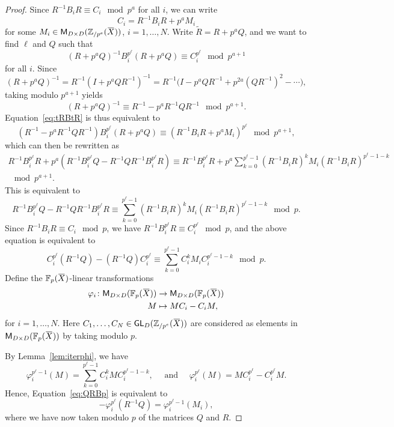 \documentclass[letterpaper, 11pt, thm-restate]{article}
\numberwithin{equation}{section}
\newcommand{\F}{\mathbb{F}}
\newcommand{\Zpe}{\mathbb{Z}_{/p^e}}
\newcommand{\GL}{\mathsf{GL}}
\newcommand{\M}{\mathsf{M}}
\newcommand{\tR}{\widetilde{R}}
\newcommand{\oX}{\mkern 1.5mu\overline{\mkern-1.5mu X \mkern-1.5mu}\mkern 1.5mu}
\theoremstyle{definition}
\theoremstyle{definition}
\theoremstyle{definition}
\begin{document}
\begin{proof}
    Since $R^{-1} B_i R \equiv C_i \mod p^a$ for all $i$, we can write 
    \[
    C_i = R^{-1} B_i R + p^a M_i
    \]
    for some $M_i \in \M_{D \times D}(\Zpe(\oX))$, $i = 1, \ldots, N$.
    Write $\tR = R + p^{a} Q$, and we want to find $\ell$ and $Q$ such that
    \begin{equation}\label{eq:tRBtR}
    (R + p^{a} Q)^{-1} B_i^{p^{\ell}} (R + p^{a} Q) \equiv C_i^{p^{\ell}} \mod p^{a+1}
    \end{equation}
    for all $i$.
    Since
    \[
    (R + p^{a} Q)^{-1} = R^{-1}  (I + p^{a} Q R^{-1})^{-1} = R^{-1}\Big(I - p^{a} Q R^{-1} + p^{2a} (Q R^{-1})^2 - \cdots \Big),
    \]
    taking modulo $p^{a+1}$ yields
    \[
    (R + p^{a} Q)^{-1} \equiv R^{-1} - p^{a} R^{-1}QR^{-1} \mod p^{a+1}.
    \]
    Equation~\eqref{eq:tRBtR} is thus equivalent to
    \[
    (R^{-1} - p^{a} R^{-1}QR^{-1}) B_i^{p^{\ell}} (R + p^{a} Q) \equiv (R^{-1} B_i R + p^a M_i)^{p^{\ell}} \mod p^{a+1},
    \]
    which can then be rewritten as
    \begin{multline*}
    R^{-1} B_i^{p^{\ell}} R + p^a(R^{-1} B_i^{p^{\ell}} Q - R^{-1} Q R^{-1} B_i^{p^{\ell}} R) \equiv R^{-1} B_i^{p^{\ell}} R + p^a \sum_{k=0}^{p^{\ell}-1} (R^{-1} B_i R)^k M_i (R^{-1} B_i R)^{p^{\ell}-1-k} \\
    \mod p^{a+1}.
    \end{multline*}
    This is equivalent to 
    \[
    R^{-1} B_i^{p^{\ell}} Q - R^{-1} Q R^{-1} B_i^{p^{\ell}} R \equiv \sum_{k=0}^{p^{\ell}-1} (R^{-1} B_i R)^k M_i (R^{-1} B_i R)^{p^{\ell}-1-k} \mod p.
    \]
    Since $R^{-1} B_i R \equiv C_i \mod p$, we have $R^{-1} B_i^{p^{\ell}} R \equiv C_i^{p^{\ell}} \mod p$, and the above equation is equivalent to
    \begin{equation}\label{eq:QRBp}
    C_i^{p^{\ell}} (R^{-1} Q) - (R^{-1} Q) C_i^{p^{\ell}} \equiv \sum_{k=0}^{p^{\ell}-1} C_i^k M_i C_i^{p^{\ell}-1-k} \mod p.
    \end{equation}
    Define the $\F_p(\oX)$-linear transformations
    \begin{align*}
        \varphi_i \colon \M_{D \times D}(\F_p(\oX)) & \rightarrow \M_{D \times D}(\F_p(\oX)) \\
        M & \mapsto M C_i - C_i M,
    \end{align*}
    for $i = 1, \ldots, N$.
    Here $C_1, \ldots, C_N \in \GL_D(\Zpe(\oX))$ are considered as elements in $\M_{D \times D}(\F_p(\oX))$ by taking modulo $p$.

    By Lemma~\ref{lem:iterphi}, we have 
    \[
    \varphi_i^{p^{\ell}-1}(M) = \sum_{k=0}^{p^{\ell}-1} C_i^k M C_i^{p^{\ell}-1-k}, \quad \text{ and } \quad \varphi_i^{p^{\ell}}(M) = M C_i^{p^{\ell}} - C_i^{p^{\ell}} M.
    \]
    Hence, Equation~\eqref{eq:QRBp} is equivalent to 
    \begin{equation}\label{eq:varphipp1}
    - \varphi_i^{p^{\ell}}(R^{-1} Q) = \varphi_i^{p^{\ell}-1}(M_i),
    \end{equation}
    where we have now taken modulo $p$ of the matrices $Q$ and $R$.


\end{proof}
\end{document}
